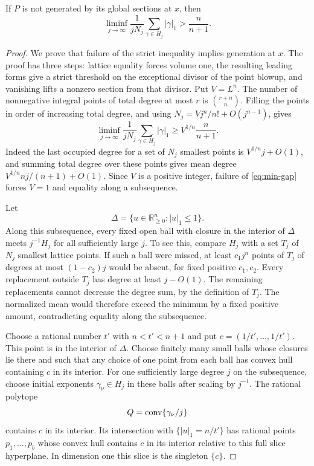 \begin{proposition}
\label{prop:ordinary-gap}
If $P$ is not generated by its global sections at $x$, then
\begin{equation}
\label{eq:min-gap}
 \liminf_{j\longrightarrow\infty}
   \frac{1}{jN_j}\sum_{\gamma\in H_j}|\gamma|_1
       >\frac{n}{n+1}.
\end{equation}
\end{proposition}

\begin{proof}
We prove that failure of the strict inequality implies generation at $x$. The proof has three steps: lattice equality forces volume one, the resulting leading forms give a strict threshold on the exceptional divisor of the point blowup, and vanishing lifts a nonzero section from that divisor. Put $V=L^n$. The number of nonnegative integral points of total degree at most $r$ is $\binom{r+n}{n}$. Filling the points in order of increasing total degree, and using $N_j=Vj^n/n!+O(j^{n-1})$, gives
\begin{equation}
\label{eq:min-lattice-lower}
 \liminf_{j\longrightarrow\infty}
 \frac{1}{jN_j}\sum_{\gamma\in H_j}|\gamma|_1
 \geq V^{1/n}\frac{n}{n+1}.
\end{equation}
Indeed the last occupied degree for a set of $N_j$ smallest points is $V^{1/n}j+O(1)$, and summing total degree over these points gives mean degree $V^{1/n}nj/(n+1)+O(1)$. Since $V$ is a positive integer, failure of \eqref{eq:min-gap} forces $V=1$ and equality along a subsequence.

Let
\[
 \Delta=\{u\in\mathbb{R}_{\geq0}^n:|u|_1\leq1\}.
\]
Along this subsequence, every fixed open ball with closure in the interior of $\Delta$ meets $j^{-1}H_j$ for all sufficiently large $j$. To see this, compare $H_j$ with a set $T_j$ of $N_j$ smallest lattice points. If such a ball were missed, at least $c_1j^n$ points of $T_j$ of degrees at most $(1-c_2)j$ would be absent, for fixed positive $c_1,c_2$. Every replacement outside $T_j$ has degree at least $j-O(1)$. The remaining replacements cannot decrease the degree sum, by the definition of $T_j$. The normalized mean would therefore exceed the minimum by a fixed positive amount, contradicting equality along the subsequence.

Choose a rational number $t'$ with $n<t'<n+1$ and put $c=(1/t',\ldots,1/t')$. This point is in the interior of $\Delta$. Choose finitely many small balls whose closures lie there and such that any choice of one point from each ball has convex hull containing $c$ in its interior. For one sufficiently large degree $j$ on the subsequence, choose initial exponents $\gamma_\nu\in H_j$ in these balls after scaling by $j^{-1}$. The rational polytope
\[
 Q=\operatorname{conv}\{\gamma_\nu/j\}
\]
contains $c$ in its interior. Its intersection with $\{|u|_1=n/t'\}$ has rational points $p_1,\ldots,p_b$ whose convex hull contains $c$ in its interior relative to this full slice hyperplane. In dimension one this slice is the singleton $\{c\}$.


\end{proof}
